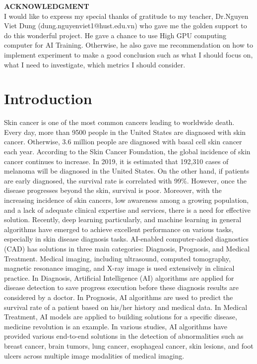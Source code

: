 \textbf{ACKNOWLEDGMENT} \\ 
I would like to express my special thanks of gratitude to my teacher, Dr.Nguyen Viet Dung (dung.nguyenviet1@hust.edu.vn) who gave me the golden support to do this wonderful project. He gave a chance to use High GPU computing computer for AI Training. Otherwise, he also gave me recommendation on how to implement experiment to make a good conclusion such as what I should focus on, what I need to investigate, which metrics I should consider.  
\section{Introduction}
Skin cancer is one of the most common cancers leading to worldwide death. Every day, more than 9500\cite{03358} people in the United States are diagnosed with skin cancer. Otherwise, 3.6\cite{03358} million people are diagnosed with basal cell skin cancer each year. According to the Skin Cancer Foundation, the global incidence of skin cancer continues to increase\cite{11872}. In 2019, it is estimated that 192,310 cases of melanoma will be diagnosed in the United States\cite{11872}. On the other hand, if patients are early diagnosed, the survival rate is correlated with 99\%. However, once the disease progresses beyond the skin, survival is poor\cite{11872}. Moreover, with the increasing incidence of skin cancers, low awareness among a growing population, and a lack of adequate clinical expertise and services, there is a need for effective solution. \newline
Recently, deep learning particularly, and machine learning in general algorithms have emerged to achieve excellent performance on various tasks, especially in skin disease diagnosis tasks. AI-enabled computer-aided diagnostics (CAD) has solutions in three main categories: Diagnosis, Prognosis, and Medical Treatment. Medical imaging, including ultrasound, computed tomography, magnetic resonance imaging, and X-ray image is used extensively in clinical practice. In Diagnosis, Artificial Intelligence (AI) algorithms are applied for disease detection to save progress execution before these diagnosis results are considered by a doctor. In Prognosis, AI algorithms are used to predict the survival rate of a patient based on his/her history and medical data. In Medical Treatment, AI models are applied to building solutions for a specific disease, medicine revolution is an example. In various studies, AI algorithms have provided various end-to-end solutions in the detection of abnormalities such as breast cancer, brain tumors, lung cancer, esophageal cancer, skin lesions, and foot ulcers across multiple image modalities of medical imaging\cite{11872}. \\
